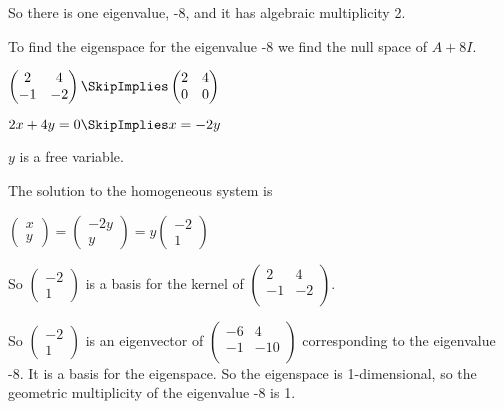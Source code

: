 \documentclass[oneside,12pt]{amsart}
\begin{document}
So there is one eigenvalue, -8, and it has algebraic multiplicity 2.

\bigskip

To find the eigenspace for the eigenvalue -8 we find the null space of $A+8 I$.

\bigskip

$
\begin{pmatrix}
2 & 4 \\
-1 & -2 \\
\end{pmatrix}
\SkipImplies
\begin{pmatrix}
2 & 4 \\
0 & 0 \\
\end{pmatrix}
$

\bigskip

$2x + 4y = 0\SkipImplies x = -2y$

\bigskip

$y$ is a free variable.

\bigskip

The solution to the homogeneous system is

\bigskip


$
\begin{pmatrix}
x \\ y
\end{pmatrix}
=
\begin{pmatrix}
-2y \\ y
\end{pmatrix}
=
y
\begin{pmatrix}
-2 \\ 1
\end{pmatrix}
$

\bigskip

So
$
\begin{pmatrix}
-2 \\ 1
\end{pmatrix}
$
is a basis for the kernel of
$
\begin{pmatrix}
2 & 4 \\
-1 & -2 \\
\end{pmatrix}
$.

\bigskip


So
$
\begin{pmatrix}
-2 \\ 1
\end{pmatrix}
$
is an eigenvector of
$
\begin{pmatrix}
-6 & 4 \\
-1 & -10 \\
\end{pmatrix}
$
corresponding to the eigenvalue -8. It is a basis for the eigenspace.
So the eigenspace is 1-dimensional, so the geometric
multiplicity of the eigenvalue -8 is 1.
\end{document}
